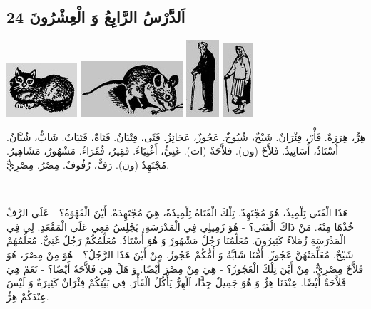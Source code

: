 \documentclass[a5paper]{article}
\begin{document}
\subsection{24 اَلدَّرْسُ الرَّابِعُ وَ الْعِشْرُونَ}
 \includegraphics[width=1.0311in,height=0.7811in]{MuhammadBagauddinlatinized-img041.jpg}   \includegraphics[width=1.5in,height=0.8126in]{MuhammadBagauddinlatinized-img042.jpg}   \includegraphics[width=0.4791in,height=1.1252in]{MuhammadBagauddinlatinized-img043.jpg}   \includegraphics[width=0.448in,height=1.0728in]{MuhammadBagauddinlatinized-img044.jpg} 

هِرٌّ، هِرَرَةٌ. فَأْرٌ، فِئْرَانٌ. شَيْخٌ، شُيُوخٌ. عَجُوزٌ، عَجَائِزُ. فَتًى، فِتْيَانٌ. فَتَاةٌ، فَتَيَاتٌ. شَابٌّ، شُبَّانٌ. أُسْتَاذٌ، أَسَاتِيذُ. فَلاَّحٌ (ون). فلاَّحَةٌ (ات). غَنِيٌّ، أَغْنِيَاءُ. فَقِيرٌ، فُقَرَاءُ. مَشْهُورٌ، مَشَاهِيرُ. مُجْتَهِدٌ (ون). رَفٌّ، رُفُوفٌ. مِصْرُ. مِصْرِيٌّ.

\_\_\_\_\_\_\_\_\_\_\_\_\_\_\_\_\_\_\_\_\_\_\_

هَذَا الْفَتَى تِلْمِيذٌ، هُوَ مُجْتَهِدٌ. تِلْكَ الْفَتَاةُ تِلْمِيذَةٌ، هِيَ مُجْتَهِدَةٌ. أَيْنَ الْقَهْوَةُ؟ - عَلَى الرَّفِّ خُذْهَا مِنْهُ. مَنْ ذَاكَ الْفَتَى؟ - هُوَ زَمِيلِي فِي الْمَدْرَسَةِ، يَجْلِسُ مَعِي عَلَى الْمَقْعَدِ. لِي فِي الْمَدْرَسَةِ زُمَلاَءُ كَثِيرُونَ. مُعَلِّمُنَا رَجُلٌ مَشْهُورٌ وَ هُوَ أُسْتَاذٌ. مُعَلِّمُكُمْ رَجُلٌ غَنِيٌّ. مُعَلِّمُهُمْ شَيْخٌ. مُعَلِّمَتُهُنَّ عَجُوزٌ. أُمُّنَا شَابَّةٌ وَ أُمُّكُمْ عَجُوزٌ. مِنْ أَيْنَ هَذَا الرَّجُلُ؟ - هُوَ مِنْ مِصْرَ، هُوَ فَلاَّحٌ مِصْرِيٌّ. مِنْ أَيْنَ تِلْكَ الْعَجُوزُ؟ - هِيَ مِنْ مِصْرَ أَيْضًا. وَ هَلْ هِيَ فَلاَّحَةٌ أَيْضًا؟ - نَعَمْ هِيَ فَلاَّحَةٌ أَيْضًا. عِنْدَنَا هِرٌّ وَ هُوَ جَمِيلٌ جِدًّا، اَلْهِرُّ يَأْكُلُ الْفَأْرَ. فِي بَيْتِكُمْ فِئْرَانٌ كَثِيرَةٌ وَ لَيْسَ عِنْدَكُمْ هِرٌّ.
\end{document}
